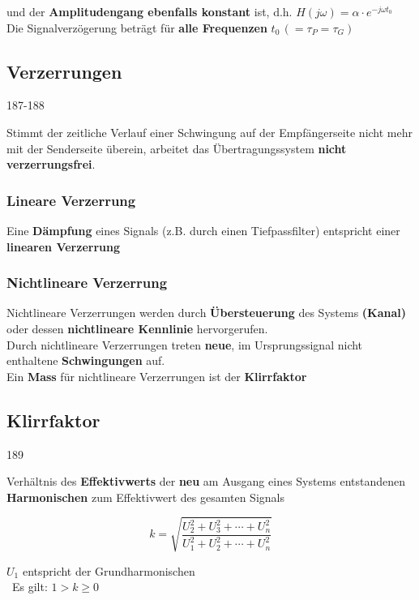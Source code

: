 und der \textbf{Amplitudengang ebenfalls konstant} ist, d.h. $H(j \omega) = \alpha \cdot e^{-j \omega t_0}$ \\
Die Signalverzögerung beträgt für \textbf{alle Frequenzen} $t_0 \, (= \tau_P = \tau_G) $ 


\subsection{Verzerrungen}{187-188}

Stimmt der zeitliche Verlauf einer Schwingung auf der Empfängerseite nicht mehr mit der Senderseite überein, arbeitet das
Übertragungssystem \textbf{nicht verzerrungsfrei}.


\subsubsection{Lineare Verzerrung}

Eine \textbf{Dämpfung} eines Signals (z.B. durch einen Tiefpassfilter) entspricht einer \textbf{linearen Verzerrung}


\subsubsection{Nichtlineare Verzerrung}

Nichtlineare Verzerrungen werden durch \textbf{Übersteuerung} des Systems \textbf{(Kanal)} oder dessen
\textbf{nichtlineare Kennlinie} hervorgerufen. \\
Durch nichtlineare Verzerrungen treten \textbf{neue}, im Ursprungssignal nicht enthaltene \textbf{Schwingungen} auf.\\
Ein \textbf{Mass} für nichtlineare Verzerrungen ist der \textbf{Klirrfaktor}


\subsection{Klirrfaktor}{189}

Verhältnis des \textbf{Effektivwerts} der \textbf{neu} am Ausgang eines Systems entstandenen \textbf{Harmonischen} zum 
Effektivwert des gesamten Signals

\begin{minipage}[b]{0.48\columnwidth}
    $$ \boxed{ k = \sqrt{\frac{U_2^2 + U_3^2 + \cdots + U_n^2}{U_1^2 + U_2^2 + \cdots + U_n^2}}} $$
\end{minipage}
\hfill
\begin{minipage}[c]{0.48\columnwidth}
    \raggedright%
    $U_1$ entspricht der Grundharmonischen\\
    \textrightarrow\ Es gilt: $1 > k \geq 0$
\end{minipage}


